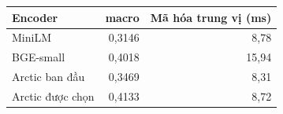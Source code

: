 \begin{tabularx}{\textwidth}{@{}Yrr@{}}
\hline
Encoder & \Hstar{} macro & Mã hóa trung vị (ms) \\\hline
MiniLM & 0,3146 & 8,78 \\
BGE-small & 0,4018 & 15,94 \\
Arctic ban đầu & 0,3469 & 8,31 \\
Arctic được chọn & 0,4133 & 8,72 \\
\hline
\end{tabularx}
